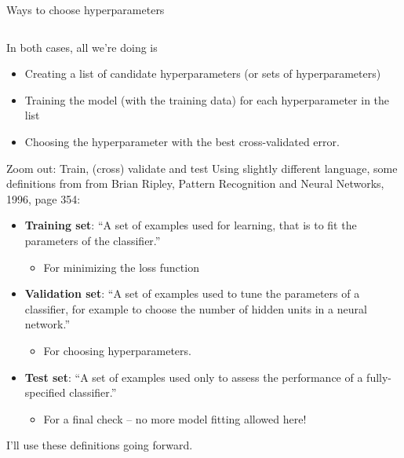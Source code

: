 \documentclass[mathserif, aspectratio=169]{beamer}
\begin{document}
\begin{frame}{Ways to choose hyperparameters}
\begin{columns}
	\end{columns}
	In both cases, all we're doing is 
	\begin{itemize}
		\item Creating a list of candidate hyperparameters (or sets of hyperparameters)
		\item Training the model (with the training data) for each hyperparameter in the list
		\item Choosing the hyperparameter with the best cross-validated error.
	\end{itemize}
\end{frame}

\begin{frame}{Zoom out: Train, (cross) validate and test}
	Using slightly different language, some definitions from from Brian Ripley, Pattern Recognition and Neural Networks, 1996, page 354:
	\vspace{5mm}
	\begin{itemize} 
		\item \textbf{Training set}: ``A set of examples used for learning, that is to fit the parameters of the classifier.''
		\begin{itemize}
			\item<2->{For minimizing the loss function}
		\end{itemize}
		\item\textbf{ Validation set}: ``A set of examples used to tune the parameters of a classifier, for example to choose the number of hidden units in a neural network.''
		\begin{itemize}
			\item<3-> For choosing hyperparameters.
		\end{itemize}
		\item \textbf{Test set}: ``A set of examples used only to assess the performance of a fully-specified classifier.''
		\begin{itemize}
			\item<4->For a final check -- no more model fitting allowed here!
		\end{itemize}
	\end{itemize}
	\vspace{5mm}
	I'll use these definitions going forward.  
\end{frame}
\end{document}
